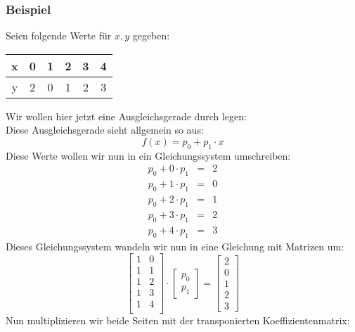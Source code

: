 \documentclass{article}
\begin{document}
			\subsubsection{Beispiel}
				Seien folgende Werte für $x, y$ gegeben:\\
				\begin{center} \begin{tabular}{c|c|c|c|c|c}
					x & 0 & 1 & 2 & 3 & 4\\ \hline
					y & 2 & 0 & 1 & 2 & 3\\
				\end{tabular} \end{center}
				Wir wollen hier jetzt eine Ausgleichsgerade durch legen: \\Diese Ausgleichsgerade sieht allgemein so aus:
				\begin{equation*}
						f(x) = p_0 + p_1 \cdot x
				\end{equation*}
				Diese Werte wollen wir nun in ein Gleichungssystem umschreiben:
				\begin{eqnarray*}
					p_0 + 0 \cdot p_1 &=& 2 \\ 
					p_0 + 1 \cdot p_1 &=& 0 \\ 
					p_0 + 2 \cdot p_1 &=& 1 \\
					p_0 + 3 \cdot p_1 &=& 2 \\
					p_0 + 4 \cdot p_1 &=& 3
				\end{eqnarray*}
				Dieses Gleichungssystem wandeln wir nun in eine Gleichung mit Matrizen um:
				\begin{equation*}
					\begin{bmatrix}
						1 & 0 \\ 1 & 1 \\ 1 & 2 \\ 1 & 3 \\ 1 & 4 \\
					\end{bmatrix} \cdot \begin{bmatrix}
					p_0 \\ p_1
					\end{bmatrix} = \begin{bmatrix} 2 \\ 0 \\ 1 \\ 2 \\ 3 \end{bmatrix}
				\end{equation*}
				Nun multiplizieren wir beide Seiten mit der transponierten Koeffizientenmatrix:
\end{document}
